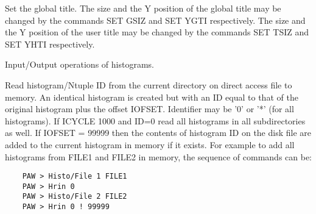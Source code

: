 
\BEGARG
{}
\ENDARG
{}
\ENDOPT

   \par
Set the global title.  The size and the Y position of the global title may 
   be changed by the commands SET GSIZ and SET YGTI respectively. The size and 
   the Y position of the user title may be changed by the commands SET TSIZ 
   and SET YHTI respectively.  

\ENDCMD
{}
\ifMENUtext
   \par
Input/Output operations of histograms.  


\fi


\BEGARG
{}
\ENDARG

   \par
Read histogram/Ntuple ID from the current directory on direct access file 
   to memory.  An identical histogram is created but with an ID equal to that 
   of the original histogram plus the offset IOFSET.  Identifier may be '0' or 
   '*' (for all histograms).  If ICYCLE \KET{} 1000 and ID=0 read all 
   histograms in all subdirectories as well.  If IOFSET = 99999 then the 
   contents of histogram ID on the disk file are added to the current 
   histogram in memory if it exists. For example to add all histograms from 
   FILE1 and FILE2 in memory, the sequence of commands can be:  
\begin{verbatim}
    PAW > Histo/File 1 FILE1
    PAW > Hrin 0
    PAW > Histo/File 2 FILE2
    PAW > Hrin 0 ! 99999
\end{verbatim}

\ENDCMD


\BEGARG
{}
\ENDARG
{}
\ENDOPT

